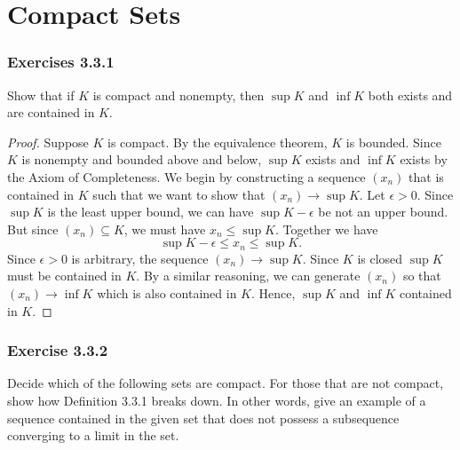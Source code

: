 \section{Compact Sets}

\subsubsection{Exercises 3.3.1} Show that if \( K \) is compact and nonempty, then \( \sup K  \) and \( \inf K \) both exists and are contained in \( K \).
\begin{proof}
   Suppose \( K \) is compact. By the equivalence theorem, \( K \) is bounded. Since \( K \) is nonempty and bounded above and below, \( \sup K  \) exists and \( \inf K \) exists by the Axiom of Completeness. We begin by constructing a sequence \( (x_n) \) that is contained in \( K \) such that we want to show that \( (x_n) \to \sup K \). Let \( \epsilon > 0  \). Since \( \sup K \) is the least upper bound, we can have \( \sup K - \epsilon   \) be not an upper bound. But since \( (x_n) \subseteq K \), we must have \( x_n \leq \sup K \). Together we have 
\[ \sup K - \epsilon \leq x_n \leq \sup K. \]
Since \( \epsilon > 0  \) is arbitrary, the sequence \( (x_n) \to \sup K \). Since \( K  \) is closed \( \sup K \) must be contained in \( K \). By a similar reasoning, we can generate \( (x_n) \)
so that \( (x_n) \to \inf K \) which is also contained in \( K \). Hence, \( \sup K  \) and \( \inf K \) contained in \( K \).
\end{proof}

\subsubsection{Exercise 3.3.2} Decide which of the following sets are compact. For those that are not compact, show how Definition 3.3.1 breaks down. In other words, give an example of a sequence contained in the given set that does not possess a subsequence converging to a limit in the set.

